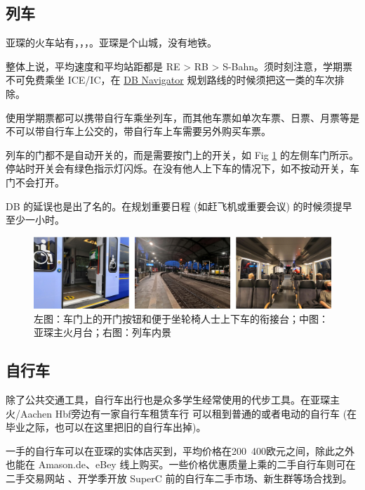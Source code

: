   \subsection{列车}\label{subsec:列车}

    亚琛的火车站有，，，。亚琛是个山城，没有地铁。

    整体上说，平均速度和平均站距都是 RE > RB > S-Bahn。须时刻注意，学期票不可免费乘坐 ICE/IC，在 \href{https://www.bahn.de/p/view/service/mobile/db-navigator.shtml}{DB Navigator} 规划路线的时候须把这一类的车次排除。

    使用学期票都可以携带自行车乘坐列车，而其他车票如单次车票、日票、月票等是不可以带自行车上公交的，带自行车上车需要另外购买车票。

    列车的门都不是自动开关的，而是需要按门上的开关，如 Fig \ref{fig:列车图集} 的左侧车门所示。停站时开关会有绿色指示灯闪烁。在没有他人上下车的情况下，如不按动开关，车门不会打开。

    DB 的延误也是出了名的。在规划重要日程 (如赶飞机或重要会议) 的时候须提早至少一小时。

    \begin{figure}[ht]
      \centering
      \includegraphics[width=\textwidth]{在亚琛学习和生活/Verkersmittel/左图：车门上的开门按钮和便于坐轮椅人士上下车的衔接台；中图：亚琛主火月台；右图：列车内景.png}
      \caption{左图：车门上的开门按钮和便于坐轮椅人士上下车的衔接台；中图：亚琛主火月台；右图：列车内景}
      \label{fig:列车图集}
    \end{figure}

  \subsection{自行车}\label{subsec:自行车}

    除了公共交通工具，自行车出行也是众多学生经常使用的代步工具。在亚琛主火/Aachen Hbf旁边有一家自行车租赁车行  可以租到普通的或者电动的自行车 (在毕业之际，也可以在这里把旧的自行车出掉)。

    一手的自行车可以在亚琛的实体店买到，平均价格在200~400欧元之间，除此之外也能在 Amason.de、eBey 线上购买。一些价格优惠质量上乘的二手自行车则可在二手交易网站 、开学季开放 SuperC 前的自行车二手市场、新生群等场合找到。

